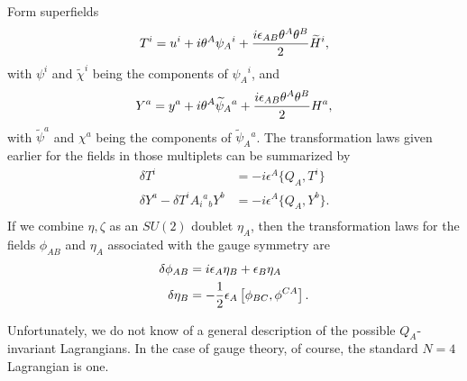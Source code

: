 \documentclass[12pt]{article}
\numberwithin{equation}{section}
\def\tilde{\widetilde}
\begin{document}
Form superfields
\begin{equation}
  \label{tisup}
  T^i=u^i+i\theta^A\psi_A{}^i+{i\epsilon_{AB}\theta^A\theta^B\over 2}
  \tilde H^i,
\end{equation}
with $\psi^i$ and $\tilde\chi^i$ being the components of $\psi_A{}^i$,
and
\begin{equation}
  \label{yisup}
  Y^a=y^a+i\theta^A \tilde\psi_A{}^a+{i\epsilon_{AB}\theta^A\theta^B
  \over 2}H^a,
\end{equation}
with $\tilde\psi^a$ and $\chi^a$ being the components of $\tilde\psi_A{}^a$.
The transformation laws given earlier for the fields in those multiplets
can be summarized by
\begin{equation}
  \label{sumtrans}
  \begin{aligned}\delta T^i & =-i\epsilon^A\{Q_A,T^i\} \\ \delta
    Y^a-\delta  T^iA_i{}^a{}_bY^b & = -i\epsilon^A \{Q_A,Y^b\}. \\
  \end{aligned}
\end{equation}
If we combine $\eta,\zeta$ as an $SU(2)$ doublet $\eta_A$,
then the transformation laws for the fields $\phi_{AB}$ and $\eta_A$
associated with the gauge symmetry are
\begin{equation}
  \label{nugtrans}
  \begin{aligned}\delta\phi_{AB}& = i
    \epsilon_A\eta_B+\epsilon_B\eta_A\\ \delta\eta_B & = -{1\over
    2}\epsilon_A\left[\phi_{BC},\phi^{CA}\right].
  \end{aligned}
\end{equation}

Unfortunately, we do not know of a general description of the possible
$Q_A$-invariant Lagrangians.  In the case of gauge theory, of course,
the standard $N=4$ Lagrangian is one.
\end{document}
